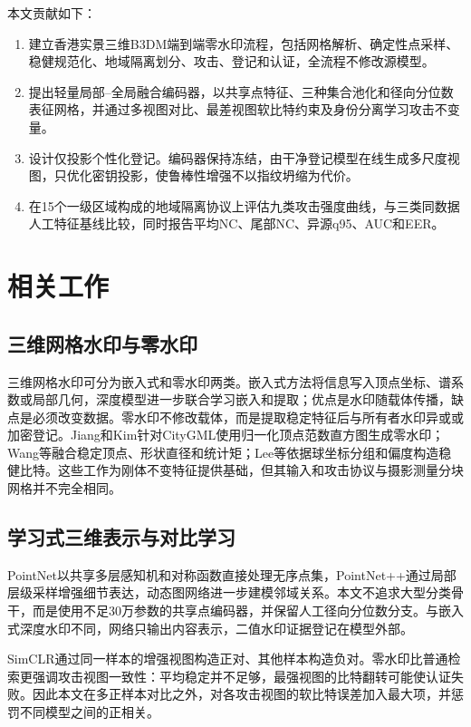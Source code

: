 \documentclass[UTF8,fontset=fandol,11pt]{ctexart}
\begin{document}
本文贡献如下：
\begin{enumerate}
\item 建立香港实景三维B3DM端到端零水印流程，包括网格解析、确定性点采样、稳健规范化、地域隔离划分、攻击、登记和认证，全流程不修改源模型。
\item 提出轻量局部--全局融合编码器，以共享点特征、三种集合池化和径向分位数表征网格，并通过多视图对比、最差视图软比特约束及身份分离学习攻击不变量。
\item 设计仅投影个性化登记。编码器保持冻结，由干净登记模型在线生成多尺度视图，只优化密钥投影，使鲁棒性增强不以指纹坍缩为代价。
\item 在15个一级区域构成的地域隔离协议上评估九类攻击强度曲线，与三类同数据人工特征基线比较，同时报告平均NC、尾部NC、异源q95、AUC和EER。
\end{enumerate}

\section{相关工作}
\subsection{三维网格水印与零水印}
三维网格水印可分为嵌入式和零水印两类。嵌入式方法将信息写入顶点坐标、谱系数或局部几何，深度模型进一步联合学习嵌入和提取\cite{WangDeepMesh2022,ZhuDeep3DMark2024}；优点是水印随载体传播，缺点是必须改变数据。零水印不修改载体，而是提取稳定特征后与所有者水印异或或加密登记。Jiang和Kim针对CityGML使用归一化顶点范数直方图生成零水印\cite{Jiang2018}；Wang等融合稳定顶点、形状直径和统计矩\cite{Wang2019}；Lee等依据球坐标分组和偏度构造稳健比特\cite{Lee2021}。这些工作为刚体不变特征提供基础，但其输入和攻击协议与摄影测量分块网格并不完全相同。

\subsection{学习式三维表示与对比学习}
PointNet以共享多层感知机和对称函数直接处理无序点集\cite{PointNet}，PointNet++通过局部层级采样增强细节表达\cite{PointNetPP}，动态图网络进一步建模邻域关系\cite{DGCNN}。本文不追求大型分类骨干，而是使用不足30万参数的共享点编码器，并保留人工径向分位数分支。与嵌入式深度水印不同，网络只输出内容表示，二值水印证据登记在模型外部。

SimCLR通过同一样本的增强视图构造正对、其他样本构造负对\cite{Chen2020}。零水印比普通检索更强调攻击视图一致性：平均稳定并不足够，最强视图的比特翻转可能使认证失败。因此本文在多正样本对比之外，对各攻击视图的软比特误差加入最大项，并惩罚不同模型之间的正相关。
\end{document}
